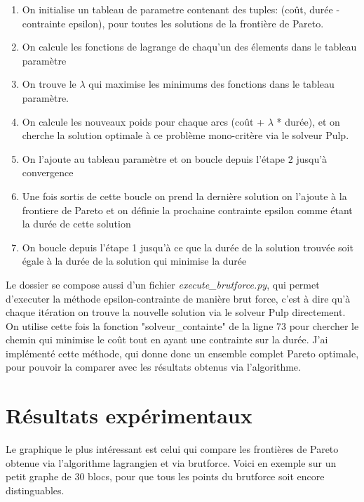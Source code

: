 \documentclass[]{article}
\begin{document}
        \begin{enumerate}
            \item On initialise un tableau de parametre contenant des tuples: (coût, durée - contrainte epsilon), pour toutes les solutions de la frontière de Pareto.
            \item On calcule les fonctions de lagrange de chaqu'un des élements dans le tableau paramètre
            \item On trouve le $\lambda$ qui maximise les minimums des fonctions dans le tableau paramètre.
            \item On calcule les nouveaux poids pour chaque arcs (coût + $\lambda$ * durée), et on cherche la solution optimale à ce problème mono-critère via le solveur Pulp.
            \item On l'ajoute au tableau paramètre et on boucle depuis l'étape 2 jusqu'à convergence
            \item Une fois sortis de cette boucle on prend la dernière solution on l'ajoute à la frontiere de Pareto et on définie la prochaine contrainte epsilon comme étant la durée de cette solution
            \item On boucle depuis l'étape 1 jusqu'à ce que la durée de la solution trouvée soit égale à la durée de la solution qui minimise la durée 
        \end{enumerate}

        Le dossier se compose aussi d'un fichier \textit{execute\_brutforce.py}, qui
        permet d'executer la méthode epsilon-contrainte de manière brut force, c'est 
        à dire qu'à chaque itération on trouve la nouvelle solution via le solveur Pulp
        directement. On utilise cette fois la fonction "solveur\_containte" de la ligne 73
        pour chercher le chemin qui minimise le coût tout en ayant une contrainte sur la 
        durée. J'ai implémenté cette méthode, qui donne donc un ensemble complet Pareto optimale,
        pour pouvoir la comparer avec les résultats obtenus via l'algorithme.

        \section{Résultats expérimentaux}

        Le graphique le plus intéressant est celui qui compare les frontières de Pareto
        obtenue via l'algorithme lagrangien et via brutforce. Voici en exemple sur un petit
        graphe de 30 blocs, pour que tous les points du brutforce soit encore distinguables.
        
\end{document}
